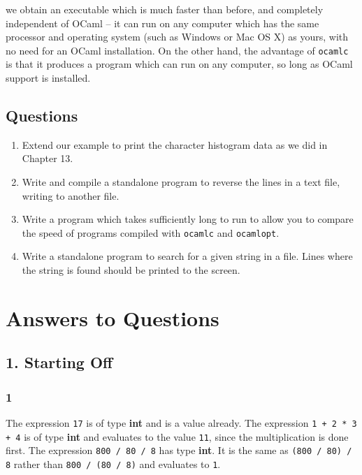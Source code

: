 \documentclass[]{book}
\begin{document}
\noindent we obtain an executable which is much faster than before, and completely independent of OCaml -- it can run on any computer which has the same processor and operating system (such as Windows or Mac OS X) as yours, with no need for an OCaml installation. On the other hand, the advantage of \texttt{ocamlc} is that it produces a program which can run on any computer, so long as OCaml support is installed.

\clearpage
\section*{Questions}

\begin{enumerate}
  \item Extend our example to print the character histogram data as we did in Chapter 13.  
  \item Write and compile a standalone program to reverse the lines in a text file, writing to another file.
  \item Write a program which takes sufficiently long to run to allow you to compare the speed of programs compiled with \texttt{ocamlc} and \texttt{ocamlopt}.
  \item Write a standalone program to search for a given string in a file. Lines where the string is found should be printed to the screen.
\end{enumerate}

\cleardoublepage
\thispagestyle{empty}


\thispagestyle{empty}
\backmatter
\renewcommand\chaptermark[1]{\markboth{#1}{}}


\cleardoublepage
\raggedbottom
\chapter{Answers to Questions}

\section*{1. Starting Off}

\subsection*{1}

The expression \texttt{17} is of type \textsf{\textbf{int}} and is a value already. The expression \texttt{1 + 2 * 3 + 4} is of type \textsf{\textbf{int}} and evaluates to the value \texttt{11}, since the multiplication is done first. The expression \texttt{800 / 80 / 8} has type \textsf{\textbf{int}}. It is the same as \texttt{(800 / 80) / 8} rather than \texttt{800 / (80 / 8)} and evaluates to \texttt{1}.
\end{document}
